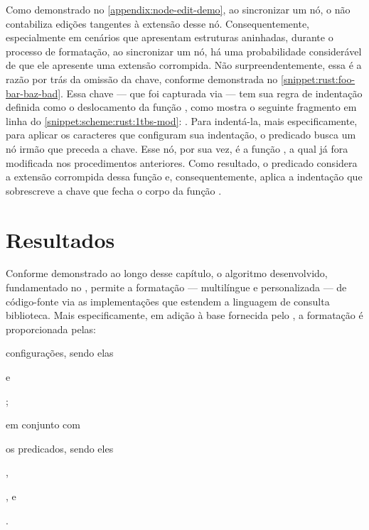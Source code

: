 \documentclass
  [11pt,a4paper,english,brazil,openright,sumario=tradicional,twoside]
  {abntex2}
\begin{document}
  Como demonstrado no \cref{appendix:node-edit-demo}, ao sincronizar um nó, o
  \treesitter não contabiliza edições tangentes à extensão desse nó.
  Consequentemente, especialmente em cenários que apresentam estruturas
  aninhadas, durante o processo de formatação, ao sincronizar um nó, há uma
  probabilidade considerável de que ele apresente uma extensão corrompida. Não
  surpreendentemente, essa é a razão por trás da omissão da chave, conforme
  demonstrada no \cref{snippet:rust:foo-bar-baz-bad}. Essa chave --- que foi
  capturada via  --- tem sua regra de indentação
  definida como o deslocamento da função , como mostra o
  seguinte fragmento em linha do \cref{snippet:scheme:rust:1tbs-mod}:
  . Para indentá-la,
  mais especificamente, para aplicar os caracteres que configuram sua
  indentação, o predicado  busca um nó irmão que
  preceda a chave. Esse nó, por sua vez, é a função , a
  qual já fora modificada nos procedimentos anteriores. Como resultado, o
  predicado considera a extensão corrompida dessa função e, consequentemente,
  aplica a indentação que sobrescreve a chave que fecha o corpo da função
  .


  \section{Resultados}

  Conforme demonstrado ao longo desse capítulo, o algoritmo desenvolvido,
  fundamentado no \treesitter, permite a formatação --- multilíngue e
  personalizada --- de código-fonte via as implementações que estendem a
  linguagem de consulta biblioteca. Mais especificamente, em adição à base
  fornecida pelo \treesitter, a formatação é proporcionada pelas:
  \begin{inparaenum}
    \item configurações, sendo elas
          \begin{inparaenum}
            \item {} e
            \item {};
          \end{inparaenum}
          em conjunto com
    \item os predicados, sendo eles
          \begin{inparaenum}
            \item {},
            \item {}, e
            \item {}.
          \end{inparaenum}
  \end{inparaenum}
\end{document}
